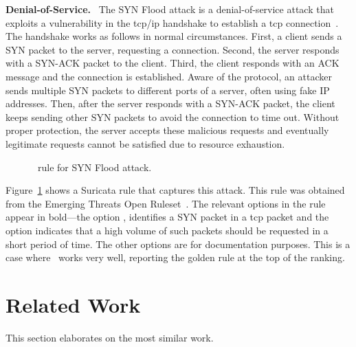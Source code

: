 \documentclass[sigconf,review, anonymous]{acmart}
\begin{document}

\textbf{Denial-of-Service.}~
The SYN Flood attack is a denial-of-service attack that exploits a
vulnerability in the tcp/ip handshake
to establish a tcp connection~\cite{cloudfare-synflood}. The handshake
works as follows in normal circumstances. First, a client sends a SYN
packet to the server, requesting a connection. Second, the server
responds with a SYN-ACK packet to the client. Third, the client
responds with an ACK message and the connection is established. Aware
of the protocol, an attacker sends multiple SYN packets to different
ports of a server, often using fake IP addresses. Then, after the
server responds with a SYN-ACK packet, the client keeps sending other
SYN packets to avoid the connection to time out. Without proper
protection, the server accepts these malicious requests and eventually
legitimate requests cannot be satisfied due to resource exhaustion.

\vspace{-1ex}
\begin{figure}[h!]
  
  \vspace{-2ex}
  \caption{\suri\ rule for SYN Flood attack.}
  \label{fig:synflood-example}
\end{figure}
\vspace{-2ex}

Figure~\ref{fig:synflood-example} shows a Suricata rule that captures
this attack. This rule was obtained from the Emerging Threats Open
Ruleset~\cite{emerging-threats-open}. The relevant options in the
rule appear in bold---the option , identifies a
SYN packet in a tcp packet and the option  indicates that a high
volume of such packets should be requested in a short period of
time. The other options are for documentation purposes. This is a case
where \tname\ works very well, reporting the golden rule at the top
of the ranking.


\section{Related Work}

This section elaborates on the most similar work.
\end{document}
